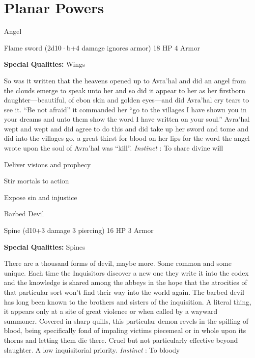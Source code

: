 \chapter{Planar Powers}
   
 


\startMonsterName
Angel	 
\stopMonsterName
 

Flame sword (2d10·b+4 damage ignores armor)	18 HP	4 Armor

 


 
\startMonsterQualities
{\bf Special Qualities:}  Wings
\stopMonsterQualities
 
\startMonsterDescription
So was it written that the heavens opened up to Avra’hal and did an angel from the clouds emerge to speak unto her and so did it appear to her as her firstborn daughter—beautiful, of ebon skin and golden eyes—and did Avra’hal cry tears to see it. “Be not afraid” it commanded her “go to the villages I have shown you in your dreams and unto them show the word I have written on your soul.” Avra’hal wept and wept and did agree to do this and did take up her sword and tome and did into the villages go, a great thirst for blood on her lips for the word the angel wrote upon the soul of Avra’hal was “kill”. {\em Instinct} : To share divine will
\stopMonsterDescription
 
\startitemize[1,packed]

\item Deliver visions and prophecy

 
\item Stir mortals to action

 
\item Expose sin and injustice


\stopitemize
 
\startMonsterName
Barbed Devil	 
\stopMonsterName
 

Spine (d10+3 damage 3 piercing)	16 HP	3 Armor

 


 
\startMonsterQualities
{\bf Special Qualities:}  Spines
\stopMonsterQualities
 
\startMonsterDescription
There are a thousand forms of devil, maybe more. Some common and some unique. Each time the Inquisitors discover a new one they write it into the codex and the knowledge is shared among the abbeys in the hope that the atrocities of that particular sort won’t find their way into the world again. The barbed devil has long been known to the brothers and sisters of the inquisition. A literal thing, it appears only at a site of great violence or when called by a wayward summoner. Covered in sharp quills, this particular demon revels in the spilling of blood, being specifically fond of impaling victims piecemeal or in whole upon its thorns and letting them die there. Cruel but not particularly effective beyond slaughter. A low inquisitorial priority. {\em Instinct} : To bloody
\stopMonsterDescription
 
